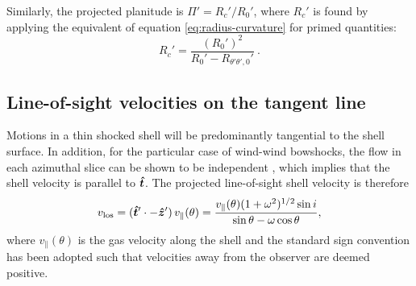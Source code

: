 Similarly, the projected planitude is \(\Pi' = R_c' / R_0'\), where
\(R_c'\) is found by applying the equivalent of equation
\eqref{eq:radius-curvature} for primed quantities:
\begin{equation}
  \label{eq:projected-radius-curvature}
  R_c' 
  = \frac{(R_0')^2}{R_0' - R_{\theta'\theta',0}'} \ .
\end{equation}

\subsection{Line-of-sight velocities on the tangent line}
\label{sec:line-sight-veloc}
Motions in a thin shocked shell will be predominantly tangential to
the shell surface. In addition, for the particular case of wind-wind
bowshocks, the flow in each azimuthal slice can be shown to be
independent \citep{Wilkin:2000a}, which implies that the shell
velocity is parallel to \(\bm{\hat{t}}\). The projected line-of-sight
shell velocity is therefore
  \begin{equation}
    \label{eq:vlos}
    v_{\mathrm{los}} = (\bm{\hat{t}}' \cdot -\bm{\hat{z}}') \, v_{\parallel}(\theta) = \frac{v_{\parallel}(\theta) (1+\omega^2)^{1/2} \sin i }{\sin\theta - \omega\cos\theta} ,
  \end{equation}
  where \( v_{\parallel}(\theta)\) is the gas velocity along the shell and the standard sign convention has been adopted such that velocities away from the observer are deemed positive. 



